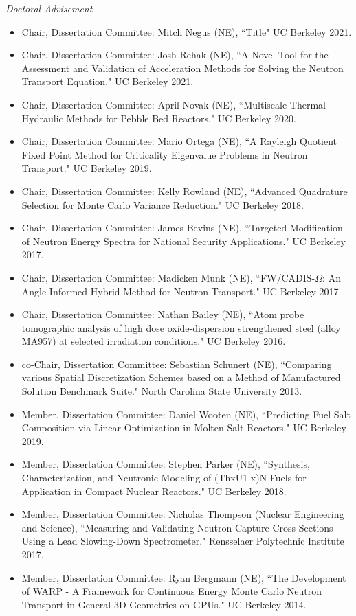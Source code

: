 \textit{Doctoral Advisement}
\begin{itemize}
\item Chair, Dissertation Committee: Mitch Negus (NE), ``Title" UC Berkeley 2021.
%
\item Chair, Dissertation Committee: Josh Rehak (NE), ``A Novel Tool for the Assessment  and Validation of Acceleration Methods for Solving the Neutron Transport Equation." UC Berkeley 2021.
%
\item Chair, Dissertation Committee: April Novak (NE), ``Multiscale
Thermal-Hydraulic Methods for Pebble Bed Reactors." UC Berkeley 2020.
%
\item Chair, Dissertation Committee: Mario Ortega (NE), ``A Rayleigh Quotient Fixed Point Method for Criticality Eigenvalue Problems in Neutron Transport."  UC Berkeley 2019.
%
\item Chair, Dissertation Committee: Kelly Rowland (NE), ``Advanced Quadrature Selection for Monte Carlo Variance Reduction."  UC Berkeley 2018.
%
\item Chair, Dissertation Committee: James Bevins (NE), ``Targeted Modification of Neutron Energy Spectra for National Security Applications."  UC Berkeley 2017.
%
\item Chair, Dissertation Committee: Madicken Munk (NE), ``FW/CADIS-$\Omega$: An Angle-Informed Hybrid Method for Neutron Transport."  UC Berkeley 2017.
%
\item Chair, Dissertation Committee: Nathan Bailey (NE), ``Atom probe tomographic analysis of high dose oxide-dispersion strengthened steel (alloy MA957) at selected irradiation conditions."  UC Berkeley 2016.
%
\item co-Chair, Dissertation Committee: Sebastian Schunert (NE), ``Comparing various Spatial Discretization Schemes based on a Method of Manufactured Solution Benchmark Suite." North Carolina State University 2013.
%
\item Member, Dissertation Committee: Daniel Wooten (NE), ``Predicting Fuel Salt Composition via Linear Optimization in Molten Salt
Reactors."  UC Berkeley 2019.
%
\item Member, Dissertation Committee: Stephen Parker (NE), ``Synthesis, Characterization, and Neutronic Modeling of (ThxU1-x)N Fuels for Application in Compact Nuclear Reactors."  UC Berkeley 2018.
%
\item Member, Dissertation Committee: Nicholas Thompson (Nuclear Engineering and Science), ``Measuring and Validating Neutron Capture Cross Sections Using a Lead Slowing-Down Spectrometer."  Rensselaer Polytechnic Institute 2017.
%
\item Member, Dissertation Committee: Ryan Bergmann (NE), ``The Development of WARP - A Framework for Continuous Energy Monte Carlo Neutron Transport in General 3D Geometries on GPUs."  UC Berkeley 2014.
\end{itemize}

